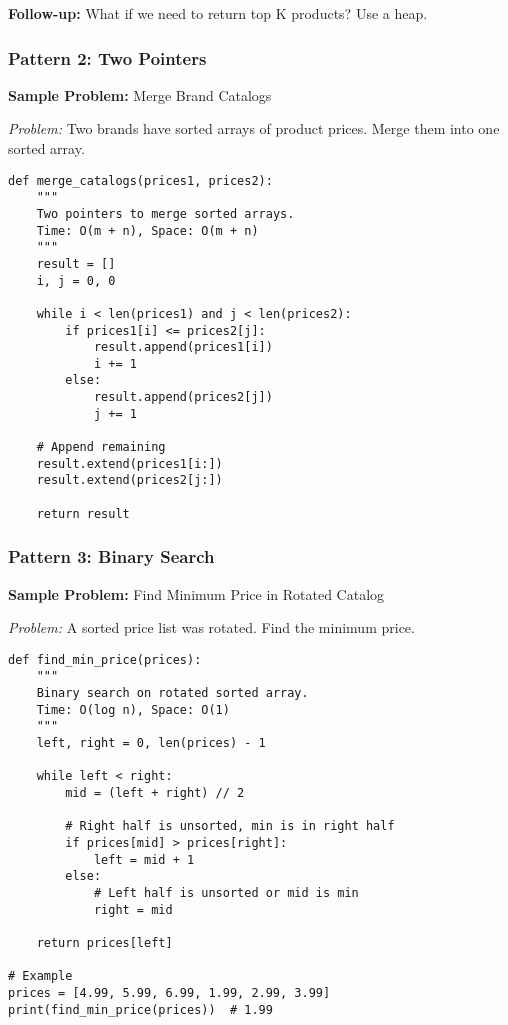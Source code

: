 \documentclass[11pt,letterpaper]{article}
\begin{document}
\textbf{Follow-up:} What if we need to return top K products? Use a heap.

\subsubsection{Pattern 2: Two Pointers}

\textbf{Sample Problem:} Merge Brand Catalogs

\textit{Problem:} Two brands have sorted arrays of product prices. Merge them into one sorted array.

\begin{lstlisting}
def merge_catalogs(prices1, prices2):
    """
    Two pointers to merge sorted arrays.
    Time: O(m + n), Space: O(m + n)
    """
    result = []
    i, j = 0, 0

    while i < len(prices1) and j < len(prices2):
        if prices1[i] <= prices2[j]:
            result.append(prices1[i])
            i += 1
        else:
            result.append(prices2[j])
            j += 1

    # Append remaining
    result.extend(prices1[i:])
    result.extend(prices2[j:])

    return result
\end{lstlisting}

\subsubsection{Pattern 3: Binary Search}

\textbf{Sample Problem:} Find Minimum Price in Rotated Catalog

\textit{Problem:} A sorted price list was rotated. Find the minimum price.

\begin{lstlisting}
def find_min_price(prices):
    """
    Binary search on rotated sorted array.
    Time: O(log n), Space: O(1)
    """
    left, right = 0, len(prices) - 1

    while left < right:
        mid = (left + right) // 2

        # Right half is unsorted, min is in right half
        if prices[mid] > prices[right]:
            left = mid + 1
        else:
            # Left half is unsorted or mid is min
            right = mid

    return prices[left]

# Example
prices = [4.99, 5.99, 6.99, 1.99, 2.99, 3.99]
print(find_min_price(prices))  # 1.99
\end{lstlisting}
\end{document}
